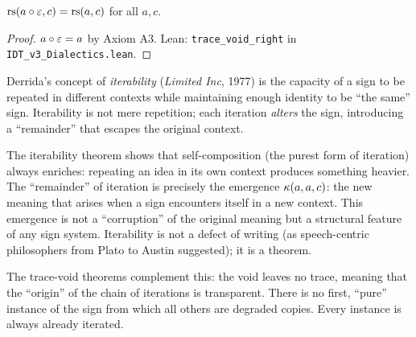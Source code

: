 \begin{theorem}
\label{thm:trace-void-right}
$\mathrm{rs}(a \circ \varepsilon, c) = \mathrm{rs}(a, c)$ for all $a, c$.
\end{theorem}

\begin{proof}
$a \circ \varepsilon = a$ by Axiom A3.
Lean: \texttt{trace\_void\_right} in \texttt{IDT\_v3\_Dialectics.lean}.
\end{proof}

\begin{interpretation}
Derrida's concept of \emph{iterability} (\textit{Limited Inc}, 1977) is the
capacity of a sign to be repeated in different contexts while maintaining
enough identity to be ``the same'' sign. Iterability is not mere repetition;
each iteration \emph{alters} the sign, introducing a ``remainder'' that
escapes the original context.

The iterability theorem shows that self-composition (the purest form of
iteration) always enriches: repeating an idea in its own context produces
something heavier. The ``remainder'' of iteration is precisely the emergence
$\kappa(a, a, c)$: the new meaning that arises when a sign encounters itself
in a new context. This emergence is not a ``corruption'' of the original
meaning but a structural feature of any sign system. Iterability is not a
defect of writing (as speech-centric philosophers from Plato to Austin
suggested); it is a theorem.

The trace-void theorems complement this: the void leaves no trace, meaning
that the ``origin'' of the chain of iterations is transparent. There is no
first, ``pure'' instance of the sign from which all others are degraded copies.
Every instance is always already iterated.
\end{interpretation}

